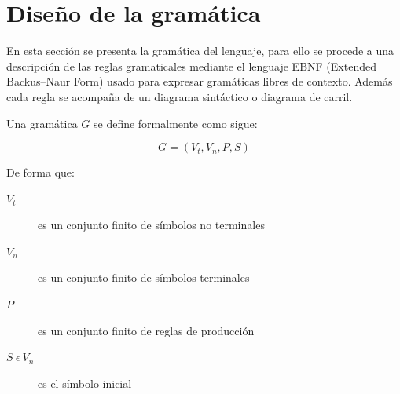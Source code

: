 \section{Diseño de la gramática}
En esta sección se presenta la gramática del lenguaje, para ello 
se procede a una descripción de las reglas gramaticales
 mediante el lenguaje EBNF (Extended Backus–Naur Form) 
usado para expresar gramáticas libres de contexto. Además cada regla se acompaña de un
diagrama sintáctico o diagrama de carril. 

Una gramática $G$ se define formalmente como sigue:

$$G = (V_t,V_n, P, S)$$

De forma que:

\begin{description}
\item[$V_t$] es un conjunto finito de símbolos no terminales
\item[$V_n$] es un conjunto finito de símbolos terminales
\item[$P$] es un conjunto finito de reglas de producción
\item[$S\ \epsilon\ V_n$] es el símbolo inicial
\end{description}

